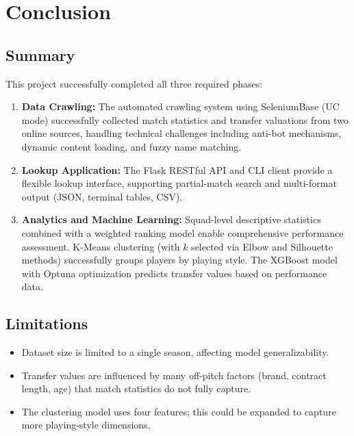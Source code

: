 \documentclass[a4paper,12pt]{report}
\begin{document}
\chapter{Conclusion}

\section{Summary}

This project successfully completed all three required phases:

\begin{enumerate}
    \item \textbf{Data Crawling:} The automated crawling system using SeleniumBase (UC mode) successfully collected match statistics and transfer valuations from two online sources, handling technical challenges including anti-bot mechanisms, dynamic content loading, and fuzzy name matching.
    
    \item \textbf{Lookup Application:} The Flask RESTful API and CLI client provide a flexible lookup interface, supporting partial-match search and multi-format output (JSON, terminal tables, CSV).
    
    \item \textbf{Analytics and Machine Learning:} Squad-level descriptive statistics combined with a weighted ranking model enable comprehensive performance assessment. K-Means clustering (with $k$ selected via Elbow and Silhouette methods) successfully groups players by playing style. The XGBoost model with Optuna optimization predicts transfer values based on performance data.
\end{enumerate}

\section{Limitations}

\begin{itemize}
    \item Dataset size is limited to a single season, affecting model generalizability.
    \item Transfer values are influenced by many off-pitch factors (brand, contract length, age) that match statistics do not fully capture.
    \item The clustering model uses four features; this could be expanded to capture more playing-style dimensions.
\end{itemize}
\end{document}
